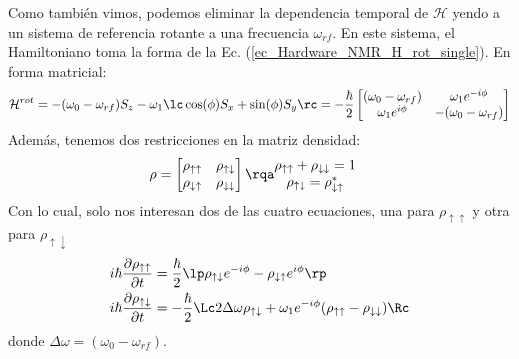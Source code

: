     Como también vimos, podemos eliminar la dependencia temporal de $\mathcal{H}$ yendo a un sistema de referencia rotante a una frecuencia $\omega_{rf}$. En este sistema, el Hamiltoniano toma la forma de la Ec. (\ref{ec_Hardware_NMR_H_rot_single}). En forma matricial:
    \begin{equation}
        \mathcal{H}^{rot} = - (\omega_0 - \omega_{rf}) S_z - \omega_1 \lc \cos (\phi) S_x + \sin (\phi) S_y \rc = 
        - \frac{\hbar}{2} \begin{bmatrix}
        (\omega_0 - \omega_{rf})  &  \omega_1 e^{-i \phi} \\
        \omega_1 e^{i \phi}          &  - (\omega_0 - \omega_{rf}) 
        \end{bmatrix}
    \end{equation}
    Además, tenemos dos restricciones en la matriz densidad: 
    \begin{equation*}
        \rho = 
        \begin{bmatrix} 
            \rho_{\uparrow \uparrow} & \rho_{\uparrow \downarrow} \\   
            \rho_{\downarrow \uparrow} & \rho_{\downarrow \downarrow}
        \end{bmatrix} 
        \rqa
        \begin{matrix}
            \rho_{\uparrow \uparrow} + \rho_{\downarrow \downarrow}  = 1 &\\
            \rho_{\uparrow \downarrow}  = \rho^{*}_{\downarrow \uparrow} &
        \end{matrix}
    \end{equation*}
    Con lo cual, solo nos interesan dos de las cuatro ecuaciones, una para $\rho_{\uparrow \uparrow}$ y otra para $\rho_{\uparrow \downarrow}$
    \begin{equation} \label{ec_decoherencia_rho_up-up_up-down} 
        \begin{aligned}
        i \hbar \frac{\partial \rho_{\uparrow \uparrow}}{\partial t} & = \frac{\hbar}{2} \lp \rho_{\uparrow \downarrow} e^{-i \phi} - \rho_{\downarrow \uparrow} e^{i \phi} \rp \\
        i \hbar \frac{\partial \rho_{\uparrow \downarrow}}{\partial t} & = 
        - \frac{\hbar}{2} \Lc 2 \Delta \omega \rho_{\uparrow \downarrow} + 
        \omega_1 e^{-i \phi} (\rho_{\uparrow \uparrow} - \rho_{\downarrow \downarrow}) \Rc 
        \end{aligned}
    \end{equation}
    donde $\Delta \omega = (\omega_0 - \omega_{rf})$.
    
